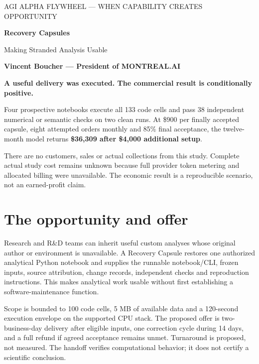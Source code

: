 \documentclass[10pt,letterpaper]{article}
\begin{document}
{\sffamily\small\color{MidPurple}AGI ALPHA FLYWHEEL --- WHEN CAPABILITY CREATES OPPORTUNITY}\par\vspace{7pt}
{\sffamily\LARGE\bfseries\color{DeepPurple}Recovery Capsules}\par
{\sffamily\Large\color{MidPurple}Making Stranded Analysis Usable}\par\vspace{7pt}
{\bfseries Vincent Boucher --- President of MONTREAL.AI}\par
\begin{tcolorbox}[colback=PalePurple,colframe=DeepPurple,arc=0pt,boxrule=.5pt,left=10pt,right=10pt]
\textbf{A useful delivery was executed. The commercial result is conditionally positive.}\par
Four prospective notebooks execute all 133 code cells and pass 38 independent numerical or semantic checks on two clean runs. At \$900 per finally accepted capsule, eight attempted orders monthly and 85\% final acceptance, the twelve-month model returns \textbf{\$36,309 after \$4,000 additional setup}.
\end{tcolorbox}
There are no customers, sales or actual collections from this study. Complete actual study cost remains unknown because full provider token metering and allocated billing were unavailable. The economic result is a reproducible scenario, not an earned-profit claim.

\section{The opportunity and offer}
Research and R\&D teams can inherit useful custom analyses whose original author or environment is unavailable. A Recovery Capsule restores one authorized analytical Python notebook and supplies the runnable notebook/CLI, frozen inputs, source attribution, change records, independent checks and reproduction instructions. This makes analytical work usable without first establishing a software-maintenance function.

Scope is bounded to 100 code cells, 5 MB of available data and a 120-second execution envelope on the supported CPU stack. The proposed offer is two-business-day delivery after eligible inputs, one correction cycle during 14 days, and a full refund if agreed acceptance remains unmet. Turnaround is proposed, not measured. The handoff verifies computational behavior; it does not certify a scientific conclusion.
\end{document}
